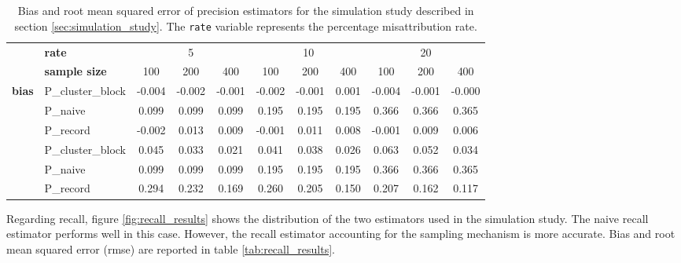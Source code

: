 \documentclass[fontsize=11pt]{article}
\theoremstyle{definition}
\begin{document}
\begin{table}\label{tab:precision_results}
    \centering
    \caption{\centering Bias and root mean squared error of precision estimators for the simulation study described in section \ref{sec:simulation_study}. The \texttt{rate} variable represents the percentage misattribution rate.}
\begin{tabular}{llccccccccc}
\toprule
{} & \hfill{\textbf{rate}} & \multicolumn{3}{c}{5} & \multicolumn{3}{c}{10} & \multicolumn{3}{c}{20} \\
\cmidrule(lr){3-5}\cmidrule(lr){6-8}\cmidrule(lr){9-11}
{} & \hfill{\textbf{sample size}} & {100} & {200} & {400} & {100} & {200} & {400} & {100} & {200} & {400} \\
\midrule
\multirow[c]{4}{*}{\textbf{bias}} & P\_cluster\_block & -0.004 & -0.002 & -0.001 & -0.002 & -0.001 & 0.001 & -0.004 & -0.001 & -0.000 \\
 & P\_naive & 0.099 & 0.099 & 0.099 & 0.195 & 0.195 & 0.195 & 0.366 & 0.366 & 0.365 \\
 & P\_record & -0.002 & 0.013 & 0.009 & -0.001 & 0.011 & 0.008 & -0.001 & 0.009 & 0.006 \\
\midrule
\multirow[c]{4}{*}{\textbf{rmse}} & P\_cluster\_block & 0.045 & 0.033 & 0.021 & 0.041 & 0.038 & 0.026 & 0.063 & 0.052 & 0.034 \\
 & P\_naive & 0.099 & 0.099 & 0.099 & 0.195 & 0.195 & 0.195 & 0.366 & 0.366 & 0.365 \\
 & P\_record & 0.294 & 0.232 & 0.169 & 0.260 & 0.205 & 0.150 & 0.207 & 0.162 & 0.117 \\
\bottomrule
\end{tabular}
\end{table}

Regarding recall, figure \ref{fig:recall_results} shows the distribution of the two estimators used in the simulation study. The naive recall estimator performs well in this case. However, the recall estimator accounting for the sampling mechanism is more accurate. Bias and root mean squared error (rmse) are reported in table \ref{tab:recall_results}.
\end{document}
